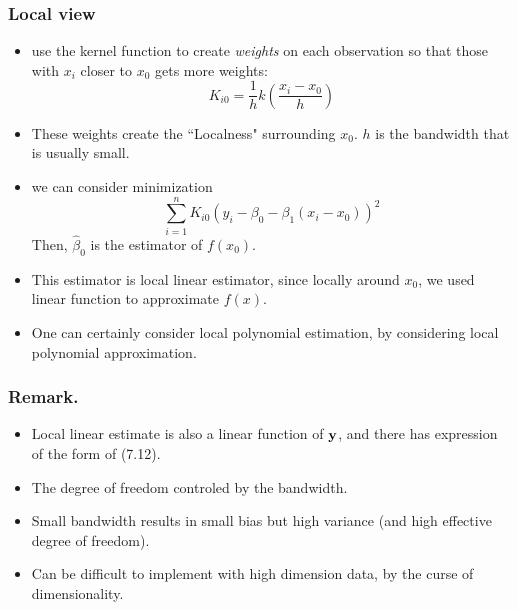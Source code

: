 \documentclass{beamer}
\begin{document}
 
 \begin{frame}
 	\frametitle{Local view }
 	\begin{itemize}
 		
 	\item use the kernel function to create {\it  weights } on each observation so that 
 	those with $x_i$ closer to $x_0$ gets more weights:
 	$$K_{i0} = \frac{1}{h} k(\frac{x_i -x_0}{h}) $$ 
 \item These weights create the ``Localness" surrounding $x_0$. $h$ is the bandwidth that is usually small.
 \item we can consider minimization
 $$ \sum_{i=1}^n K_{i0} (y_i - \beta_0 - \beta_1(x_i-x_0))^2$$
 Then, $\hat \beta_0$ is the estimator of $f(x_0)$. 
 \item This estimator is local linear estimator, since locally around $x_0$, we used linear function
 to approximate $f(x)$. 
 \item One can certainly consider local polynomial estimation, by considering local polynomial approximation.
 	 
 	\end{itemize}
 \end{frame} 
  

\begin{frame}
	\frametitle{Remark. }
	\begin{itemize}
		
		\item  Local linear estimate is also a linear function of ${\bf y}$, and there has expression of the form of (7.12). 
		\item The degree of freedom controled by the bandwidth. 
		\item Small  bandwidth results in small bias but high variance (and high effective degree of freedom).
		\item Can be difficult to implement with high dimension data, by the curse of dimensionality.
	\end{itemize}
\end{frame}
                         
\end{document}
